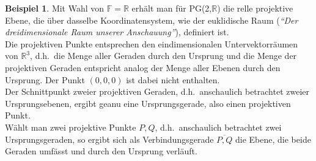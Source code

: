 \documentclass[hidelinks]{article}
\theoremstyle{plain}
\theoremstyle{definition}
\newtheorem{bsp}[thm]{Beispiel}
\theoremstyle{rem}
\begin{document}
\begin{sloppypar}
\begin{bsp}
Mit Wahl von $\mathbb{F}=\mathbb{R}$ erhält man für PG(2,$\mathbb{R}$) die relle projektive Ebene, die über dasselbe Koordinatensystem, wie der euklidische Raum (\textit{``Der dreidimensionale Raum unserer Anschauung''}), definiert ist.\\
Die projektiven Punkte entsprechen den eindimensionalen Untervektorräumen von $\mathbb{R}^3$, d.h.\ die Menge aller Geraden durch den Ursprung und die Menge der projektiven Geraden entspricht analog der Menge aller Ebenen durch den Ursprung. Der Punkt $(0,0,0)$ ist dabei nicht enthalten.\\
Der Schnittpunkt zweier projektiven Geraden, d.h.\ anschaulich betrachtet zweier Ursprungsebenen, ergibt geanu eine Ursprungsgerade, also einen projektiven Punkt.\\
Wählt man zwei projektive Punkte $P,Q$, d.h.\ anschaulich betrachtet zwei Ursprungsgeraden, so ergibt sich als Verbindungsgerade $\overline{P,Q}$ die Ebene, die beide Geraden umfässt und durch den Ursprung verläuft.

\begin{figure}[H]
\qquad	
{}
\end{figure}
\end{bsp}
\end{sloppypar}
\end{document}
